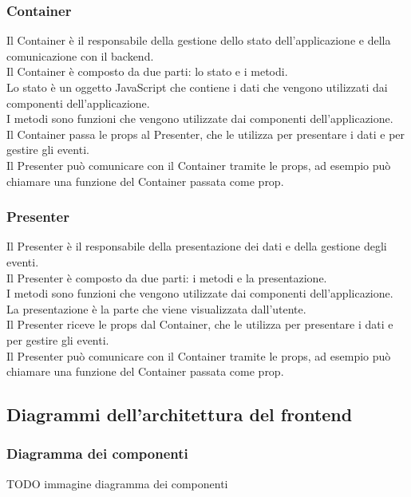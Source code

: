 \subsubsection{Container}
Il Container è il responsabile della gestione dello stato dell'applicazione e della comunicazione con il backend.\\
Il Container è composto da due parti: lo stato e i metodi.\\
Lo stato è un oggetto JavaScript che contiene i dati che vengono utilizzati dai componenti dell'applicazione.\\
I metodi sono funzioni che vengono utilizzate dai componenti dell'applicazione.\\
Il Container passa le props al Presenter, che le utilizza per presentare i dati e per gestire gli eventi.\\
Il Presenter può comunicare con il Container tramite le props, ad esempio può chiamare una funzione del Container passata come prop.\\
\subsubsection{Presenter}
Il Presenter è il responsabile della presentazione dei dati e della gestione degli eventi.\\
Il Presenter è composto da due parti: i metodi e la presentazione.\\
I metodi sono funzioni che vengono utilizzate dai componenti dell'applicazione.\\
La presentazione è la parte che viene visualizzata dall'utente.\\
Il Presenter riceve le props dal Container, che le utilizza per presentare i dati e per gestire gli eventi.\\
Il Presenter può comunicare con il Container tramite le props, ad esempio può chiamare una funzione del Container passata come prop.\\
\subsection{Diagrammi dell'architettura del frontend}
\subsubsection{Diagramma dei componenti}

TODO immagine diagramma dei componenti

